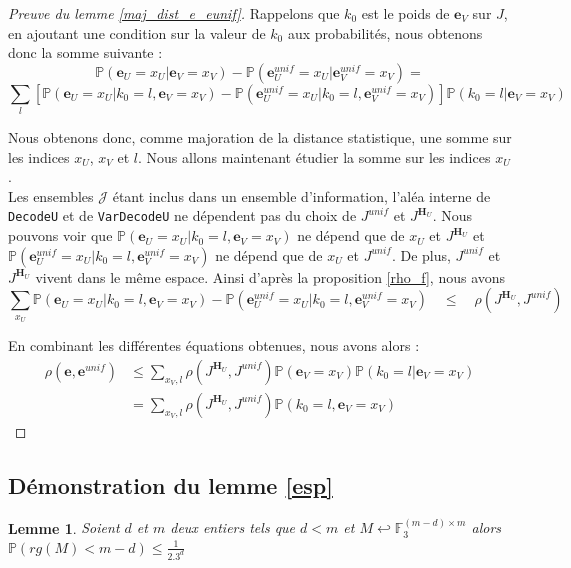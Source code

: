\documentclass[12pt]{article}
\theoremstyle{plain}
\newtheorem{lemme}[thm]{Lemme}
\theoremstyle{definition}
\newcommand{\F}{\mathbb{F}}
\newcommand{\e}{\mathbf{e}}
\newcommand{\J}{\mathcal{J}}
\begin{document}
\begin{appendix}
\begin{proof}[Preuve du lemme \ref{maj_dist_e_eunif}]
\noindent Rappelons que $k_0$ est le poids de $\e_V$ sur $J$, en ajoutant une condition sur la valeur de $k_0$ aux probabilités, nous obtenons donc la somme suivante :
{\scriptsize
$$ \mathbb{P}(\e_U=x_U|\e_V=x_V) - \mathbb{P}(\e_U^{unif}=x_U | \e_V^{unif}=x_V) =  $$
$$ \sum\limits_l \left[ \mathbb{P}(\e_U=x_U|k_0 = l,\e_V=x_V) - \mathbb{P}(\e_U^{unif}=x_U |k_0 = l, \e_V^{unif}=x_V) \right] \mathbb{P}\left(k_0 = l | \e_V =x_V\right)$$
}

\noindent Nous obtenons donc, comme majoration de la distance statistique, une somme sur les indices $x_U$, $x_V$ et $l$. Nous allons maintenant étudier la somme sur les indices $x_U$.\\
\noindent Les ensembles $\J$ étant inclus dans un ensemble d'information, l'aléa interne de \verb|DecodeU| et de \verb|VarDecodeU| ne dépendent pas du choix de $J^{unif}$ et $J^{\mathbf{H}_U}$. 
Nous pouvons voir que $\mathbb{P}(\e_U=x_U|k_0 = l,\e_V=x_V)$ ne dépend que de $x_U$ et $J^{\mathbf{H}_U}$ et   $\mathbb{P}(\e_U^{unif}=x_U |k_0 = l, \e_V^{unif}=x_V)$ ne dépend que de $x_U$ et $J^{unif}$. 
De plus, $J^{unif}$ et $J^{\mathbf{H}_U}$ vivent dans le même espace.
Ainsi d'après la proposition \ref{rho_f}, nous avons 
{\scriptsize
$$ \sum\limits_{x_U}\mathbb{P}(\e_U=x_U|k_0 = l,\e_V=x_V) - \mathbb{P}(\e_U^{unif}=x_U |k_0 = l, \e_V^{unif}=x_V)\quad \leq\quad \rho(J^{\mathbf{H}_U},J^{unif})$$
}

En combinant les différentes équations obtenues, nous avons alors :
\begin{equation*}
\begin{split}
\rho\left(\e ,\e^{unif}\right) &\leq \sum\limits_{x_V,l} \rho\left(J^{\mathbf{H}_U},J^{unif}\right)\mathbb{P}(\e_V = x_V)\mathbb{P}\left(k_0 = l| \e_V = x_V\right)\\
&=\sum\limits_{x_V,l} \rho\left(J^{\mathbf{H}_U},J^{unif}\right)\mathbb{P}\left(k_0 = l, \e_V = x_V\right)
\end{split}
\end{equation*}
\end{proof}

\subsection*{Démonstration du lemme \ref{esp}}

\begin{lemme}\label{proba_rang}
Soient $d$ et $m$ deux entiers tels que $d<m$ et $M \hookleftarrow\F_3^{(m-d)\times m}$ alors $\mathbb{P}(rg(M) < m-d) \leq \frac{1}{2 . 3^d}$
\end{lemme}


\end{appendix}
\end{document}
